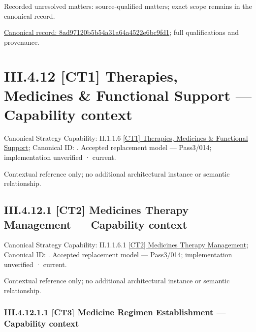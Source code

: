 {\small Recorded unresolved matters: source-qualified matters; exact scope remains in the canonical record.}\par
{\footnotesize \href{../../../../../../../../continuum/business/business-process/8ad97120b5b54a31a64a4522e6bc9fd1.md}{Canonical record: 8ad97120b5b54a31a64a4522e6bc9fd1}; full qualifications and provenance.}\par
\section*{III.4.12 [CT1] Therapies, Medicines \& Functional Support — Capability context}
\label{navigation:III.4.12}

{\small Canonical Strategy Capability: II.1.1.6 \hyperref[element:ef1291a271f54508aa65266f88be7e4b]{[CT1] Therapies, Medicines \& Functional Support}; Canonical ID: \texttt{}. Accepted replacement model — Pass3/014; implementation unverified · current.}\par
Contextual reference only; no additional architectural instance or semantic relationship.\par
\subsection*{III.4.12.1 [CT2] Medicines Therapy Management — Capability context}
\label{navigation:III.4.12.1}

{\small Canonical Strategy Capability: II.1.1.6.1 \hyperref[element:4c477c196e0b4afb83aabd274e2df0cb]{[CT2] Medicines Therapy Management}; Canonical ID: \texttt{}. Accepted replacement model — Pass3/014; implementation unverified · current.}\par
Contextual reference only; no additional architectural instance or semantic relationship.\par
\subsubsection*{III.4.12.1.1 [CT3] Medicine Regimen Establishment — Capability context}
\label{navigation:III.4.12.1.1}

